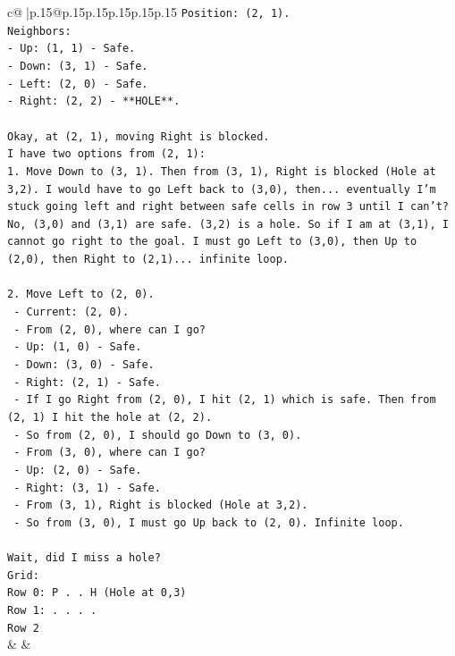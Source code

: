 \documentclass{article}
\begin{document}
{\begin{supertabular}{c@{$\;$}|p{.15\linewidth}@{}p{.15\linewidth}p{.15\linewidth}p{.15\linewidth}p{.15\linewidth}p{.15\linewidth}}
{{{\texttt{Position: (2, 1).} \\
\texttt{Neighbors:} \\
\texttt{{-} Up: (1, 1) {-} Safe.} \\
\texttt{{-} Down: (3, 1) {-} Safe.} \\
\texttt{{-} Left: (2, 0) {-} Safe.} \\
\texttt{{-} Right: (2, 2) {-} **HOLE**.} \\
\\ 
\texttt{Okay, at (2, 1), moving Right is blocked.} \\
\texttt{I have two options from (2, 1):} \\
\texttt{1. Move Down to (3, 1). Then from (3, 1), Right is blocked (Hole at 3,2). I would have to go Left back to (3,0), then... eventually I'm stuck going left and right between safe cells in row 3 until I can't? No, (3,0) and (3,1) are safe. (3,2) is a hole. So if I am at (3,1), I cannot go right to the goal. I must go Left to (3,0), then Up to (2,0), then Right to (2,1)... infinite loop.} \\
\\ 
\texttt{2. Move Left to (2, 0).} \\
\texttt{   {-} Current: (2, 0).} \\
\texttt{   {-} From (2, 0), where can I go?} \\
\texttt{     {-} Up: (1, 0) {-} Safe.} \\
\texttt{     {-} Down: (3, 0) {-} Safe.} \\
\texttt{     {-} Right: (2, 1) {-} Safe.} \\
\texttt{   {-} If I go Right from (2, 0), I hit (2, 1) which is safe. Then from (2, 1) I hit the hole at (2, 2).} \\
\texttt{   {-} So from (2, 0), I should go Down to (3, 0).} \\
\texttt{   {-} From (3, 0), where can I go?} \\
\texttt{     {-} Up: (2, 0) {-} Safe.} \\
\texttt{     {-} Right: (3, 1) {-} Safe.} \\
\texttt{   {-} From (3, 1), Right is blocked (Hole at 3,2).} \\
\texttt{   {-} So from (3, 0), I must go Up back to (2, 0). Infinite loop.} \\
\\ 
\texttt{Wait, did I miss a hole?} \\
\texttt{Grid:} \\
\texttt{Row 0: P . . H  (Hole at 0,3)} \\
\texttt{Row 1: . . . .} \\
\texttt{Row 2} \\
            }
        }
    }
    & & \\ \\


\end{supertabular}}
\end{document}
